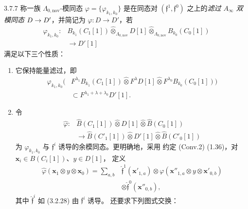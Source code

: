 \begin{definition}{3.7.7}\label{def:3-7-7}
称一族 $\Lambda_{0,\mathrm{nov}}$-模同态
$\varphi=\{\varphi_{k_1,k_0}\}$ 是在同态对
$(\mathfrak f^1,\mathfrak f^0)$ 之上的\emph{滤过 $A_\infty$ 双模同态}
$D\to D'\liftIndex{I119}$，并简记为 $\varphi\colon D\to D'$，若
\[
\begin{aligned}
\varphi_{k_1,k_0}\colon{}
&B_{k_1}(C_1[1])\widehat\otimes_{\Lambda_{0,\mathrm{nov}}}D[1]
 \widehat\otimes_{\Lambda_{0,\mathrm{nov}}}B_{k_0}(C_0[1])\\
&\longrightarrow D'[1]
\end{aligned}
\]
满足以下三个性质：
\begin{enumerate}[label=\textup{(\arabic*)},leftmargin=2.8em]
  \item 它保持能量滤过，即
  \[
  \begin{aligned}
  \varphi_{k_1,k_0}\bigl(&F^{\lambda_1}B_{k_1}(C_1[1])
    \widehat\otimes F^\lambda D[1]
    \widehat\otimes F^{\lambda_0}B_{k_0}(C_0[1])\bigr)\\
  &\subset F^{\lambda_1+\lambda+\lambda_0}D'[1].
  \end{aligned}
  \]

  \item 令
  \[
  \begin{aligned}
  \widehat\varphi\colon{}
  &\widehat B(C_1[1])\widehat\otimes D[1]\widehat\otimes
    \widehat B(C_0[1])\\
  &\longrightarrow
    \widehat B(C'_1[1])\widehat\otimes D'[1]\widehat\otimes
    \widehat B(C'_0[1])
  \end{aligned}
  \]
  为 $\varphi_{k_1,k_0}$ 与 $\mathfrak f^i$ 诱导的余模同态。更明确地，采用
  约定 (Conv.2) (1.36)，对 $\mathbf x_i\in B(C_i[1])$、$y\in D[1]$，
  定义
  \begin{equation}
  \begin{aligned}
  \widehat\varphi(\mathbf x_1\otimes y\otimes\mathbf x_0)
  =\sum_{a,b}{}&\widehat{\mathfrak f}^{1}(\mathbf x'_{1,a})
  \otimes\varphi(\mathbf x''_{1,a}\otimes y\otimes\mathbf x'_{0,b})\\
  &\otimes\widehat{\mathfrak f}^{0}(\mathbf x''_{0,b}),
  \end{aligned}
  \tag{3.7.8}\label{eq:3-7-8}
  \end{equation}
  其中 $\widehat{\mathfrak f}^{i}$ 如 (3.2.28) 由 $\mathfrak f^i$ 诱导。
  还要求下列图式交换：


\end{enumerate}
\end{definition}
